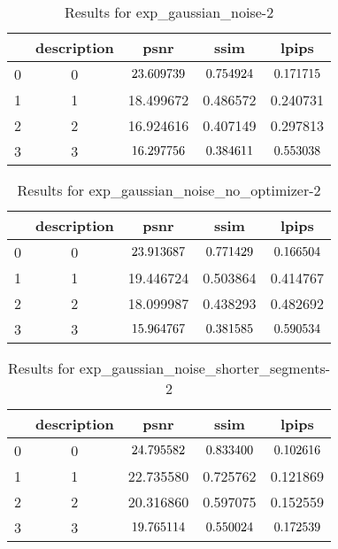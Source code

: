 \begin{table}[ht]
\centering
\caption{Results for exp\_gaussian\_noise-2}
\label{tab:exp_gaussian_noise-2}
\begin{tabular}{|l|c|c|c|c|}
\toprule
 & description & psnr & ssim & lpips \\
\midrule
0 & 0 & $\cellcolor{green} 23.609739$ & $\cellcolor{green} 0.754924$ & $\cellcolor{green} 0.171715$ \\
\cline{1-5}
1 & 1 & 18.499672 & 0.486572 & 0.240731 \\
\cline{1-5}
2 & 2 & 16.924616 & 0.407149 & 0.297813 \\
\cline{1-5}
3 & 3 & $\cellcolor{red} 16.297756$ & $\cellcolor{red} 0.384611$ & $\cellcolor{red} 0.553038$ \\
\cline{1-5}
\bottomrule
\end{tabular}
\end{table}


\begin{table}[ht]
\centering
\caption{Results for exp\_gaussian\_noise\_no\_optimizer-2}
\label{tab:exp_gaussian_noise_no_optimizer-2}
\begin{tabular}{|l|c|c|c|c|}
\toprule
 & description & psnr & ssim & lpips \\
\midrule
0 & 0 & $\cellcolor{green} 23.913687$ & $\cellcolor{green} 0.771429$ & $\cellcolor{green} 0.166504$ \\
\cline{1-5}
1 & 1 & 19.446724 & 0.503864 & 0.414767 \\
\cline{1-5}
2 & 2 & 18.099987 & 0.438293 & 0.482692 \\
\cline{1-5}
3 & 3 & $\cellcolor{red} 15.964767$ & $\cellcolor{red} 0.381585$ & $\cellcolor{red} 0.590534$ \\
\cline{1-5}
\bottomrule
\end{tabular}
\end{table}

\begin{table}
\centering
\caption{Results for exp\_gaussian\_noise\_shorter\_segments-2}
\label{tab:exp_gaussian_noise_shorter_segments-2}
\begin{tabular}{|l|c|c|c|c|}
\toprule
& description & psnr & ssim & lpips \\
\midrule
0 & 0 & $\cellcolor{green} 24.795582$ & $\cellcolor{green} 0.833400$ & $\cellcolor{red} 0.102616$ \\
\cline{1-5}
1 & 1 & 22.735580 & 0.725762 & 0.121869 \\
\cline{1-5}
2 & 2 & 20.316860 & 0.597075 & 0.152559 \\
\cline{1-5}
3 & 3 & $\cellcolor{red} 19.765114$ & $\cellcolor{red} 0.550024$ & $\cellcolor{green} 0.172539$ \\
\cline{1-5}
\bottomrule
\end{tabular}
\end{table}

